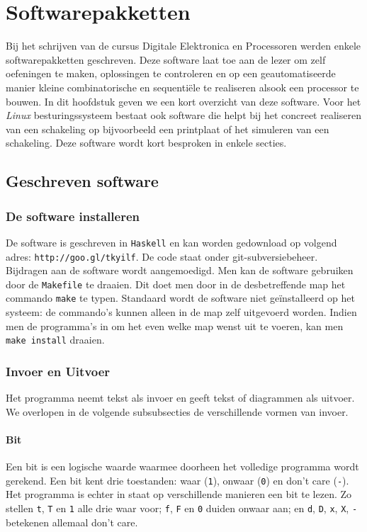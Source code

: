 \chapter{Softwarepakketten}
\begin{chapterintro}
Bij het schrijven van de cursus Digitale Elektronica en Processoren werden enkele softwarepakketten geschreven. Deze software laat toe aan de lezer om zelf oefeningen te maken, oplossingen te controleren en op een geautomatiseerde manier kleine combinatorische en sequenti\"ele te realiseren alsook een processor te bouwen. In dit hoofdstuk geven we een kort overzicht van deze software. Voor het \emph{Linux} besturingssysteem bestaat ook software die helpt bij het concreet realiseren van een schakeling op bijvoorbeeld een printplaat of het simuleren van een schakeling. Deze software wordt kort besproken in enkele secties.
\end{chapterintro}
\minitoc[n]
\section{Geschreven software}
\subsection{De software installeren}
De software is geschreven in \texttt{Haskell} en kan worden gedownload op volgend adres: \texttt{http://goo.gl/tkyilf}. De code staat onder git-subversiebeheer. Bijdragen aan de software wordt aangemoedigd. Men kan de software gebruiken door de \texttt{Makefile} te draaien. Dit doet men door in de desbetreffende map het commando \texttt{make} te typen. Standaard wordt de software niet ge\"installeerd op het systeem: de commando's kunnen alleen in de map zelf uitgevoerd worden. Indien men de programma's in om het even welke map wenst uit te voeren, kan men \texttt{make install} draaien.
\subsection{Invoer en Uitvoer}
Het programma neemt tekst als invoer en geeft tekst of diagrammen als uitvoer. We overlopen in de volgende subsubsecties de verschillende vormen van invoer.
\subsubsection{Bit}
Een bit is een logische waarde waarmee doorheen het volledige programma wordt gerekend. Een bit kent drie toestanden: waar (\texttt{1}), onwaar (\texttt{0}) en don't care (\texttt{-}). Het programma is echter in staat op verschillende manieren een bit te lezen. Zo stellen \texttt{t}, \texttt{T} en \texttt{1} alle drie waar voor; \texttt{f}, \texttt{F} en \texttt{0} duiden onwaar aan; en \texttt{d}, \texttt{D}, \texttt{x}, \texttt{X}, \texttt{-} betekenen allemaal don't care.
